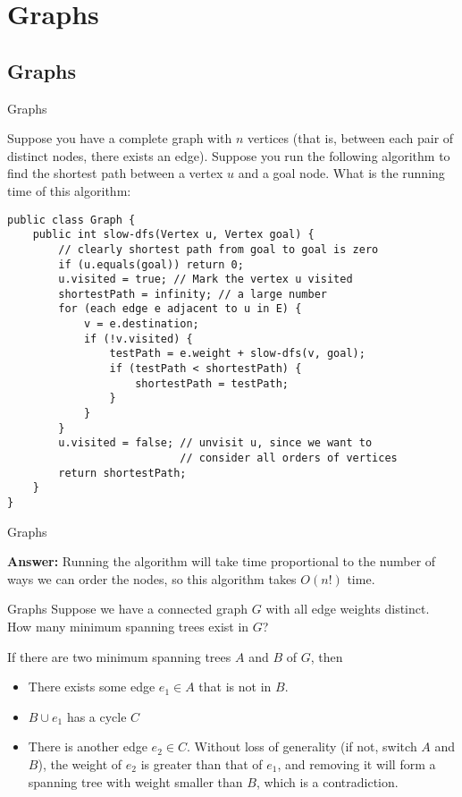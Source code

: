 \documentclass[9pt]{beamer}
\begin{document}
\section{Graphs}
\subsection{Graphs}
\begin{frame}[fragile]{Graphs}

  {\small
  Suppose you have a complete graph with $n$ vertices (that is, between each
  pair of distinct nodes, there exists an edge). Suppose you run the
  following algorithm to find the shortest path between a vertex $u$ and a
  goal node.  What is the running time of this algorithm:
  }

  {\small
  \begin{lstlisting}
public class Graph {
    public int slow-dfs(Vertex u, Vertex goal) {
        // clearly shortest path from goal to goal is zero
        if (u.equals(goal)) return 0;
        u.visited = true; // Mark the vertex u visited
        shortestPath = infinity; // a large number
        for (each edge e adjacent to u in E) {
            v = e.destination;
            if (!v.visited) {
                testPath = e.weight + slow-dfs(v, goal);
                if (testPath < shortestPath) {
                    shortestPath = testPath;
                }
            }
        }
        u.visited = false; // unvisit u, since we want to
                           // consider all orders of vertices
        return shortestPath;
    }
}
  \end{lstlisting}
  }
\end{frame}

\begin{frame}[fragile]{Graphs}

  {\bf Answer:}
  Running the algorithm will take time proportional to the number of ways we
  can order the nodes, so this algorithm takes $O(n!)$ time.
\end{frame}

\begin{frame}[fragile]{Graphs}
  Suppose we have a connected graph $G$ with all edge weights distinct. How
  many minimum spanning trees exist in $G$?
  \vspace{2em}

  \pause
  If there are two minimum spanning trees $A$ and $B$ of $G$, then

  \begin{itemize}
    \item
      There exists some edge $e_1\in A$ that is not in $B$.
    \item
      $B \cup e_1$ has a cycle $C$
    \item
      There is another edge $e_2\in C$. Without loss of generality (if not,
      switch $A$ and $B$), the weight of $e_2$ is greater than that of
      $e_1$, and removing it will form a spanning tree with weight smaller
      than $B$, which is a contradiction.
  \end{itemize}
\end{frame}
\end{document}
